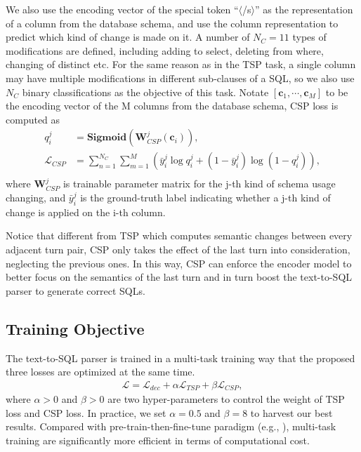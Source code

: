\documentclass[a4paper]{article}
\begin{document}
We also use the encoding vector of the special token ``$\langle$/s$\rangle$'' as the representation of a column from the database schema, and use the column representation to predict which kind of change is made on it. A number of $N_C=11$ types of modifications are defined, including adding to select, deleting from where, changing of distinct etc. For the same reason as in the TSP task, a single column may have multiple modifications in different sub-clauses of a SQL, so we also use $N_C$ binary classifications as the objective of this task. Notate $[\mathbf{c}_1, \cdots, \mathbf{c}_M]$ to be the encoding vector of the M columns from the database schema, CSP loss is computed as
\begin{equation}
    \begin{aligned}
    q_i^j &= \mathbf{Sigmoid} \left( \mathbf{W}_{CSP}^j (\mathbf{c}_i) \right), \\
    \mathcal{L}_{CSP} &= \sum_{n=1}^{N_C} \sum_{m=1}^M \left( \bar{y}_i^j \log q_i^j + (1 - \bar{y}_i^j) \log (1 - q_i^j) \right), \\
    \end{aligned}
\end{equation} where $\mathbf{W}_{CSP}^j$ is trainable parameter matrix for the j-th kind of schema usage changing, and $\bar{y}_i^j$ is the ground-truth label indicating whether a j-th kind of change is applied on the i-th column.

Notice that different from TSP which computes semantic changes between every adjacent turn pair, CSP only takes the effect of the last turn into consideration, neglecting the previous ones. In this way, CSP can enforce the encoder model to better focus on the semantics of the last turn and in turn boost the text-to-SQL parser to generate correct SQLs.

\subsection{Training Objective}

The text-to-SQL parser is trained in a multi-task training way that the proposed three losses are optimized at the same time.
\begin{equation}
    \begin{aligned}
    \mathcal{L} = \mathcal{L}_{dec} + \alpha \mathcal{L}_{TSP} + \beta \mathcal{L}_{CSP},
    \end{aligned}
\end{equation} where $\alpha > 0$ and $\beta > 0$ are two hyper-parameters to control the weight of TSP loss and CSP loss. In practice, we set $\alpha=0.5$ and $\beta=8$ to harvest our best results. Compared with pre-train-then-fine-tune paradigm (e.g., \cite{yu2020score}), multi-task training are significantly more efficient in terms of computational cost.
\end{document}
